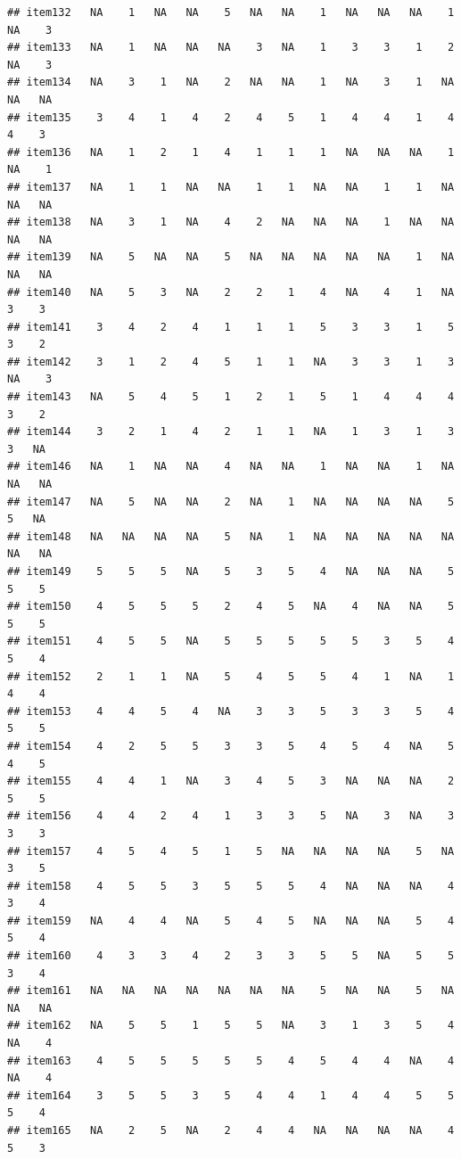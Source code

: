 \documentclass[
  man]{apa6}
\begin{document}
\begin{verbatim}
## item132   NA    1   NA   NA    5   NA   NA    1   NA   NA   NA    1   NA    3
## item133   NA    1   NA   NA   NA    3   NA    1    3    3    1    2   NA    3
## item134   NA    3    1   NA    2   NA   NA    1   NA    3    1   NA   NA   NA
## item135    3    4    1    4    2    4    5    1    4    4    1    4    4    3
## item136   NA    1    2    1    4    1    1    1   NA   NA   NA    1   NA    1
## item137   NA    1    1   NA   NA    1    1   NA   NA    1    1   NA   NA   NA
## item138   NA    3    1   NA    4    2   NA   NA   NA    1   NA   NA   NA   NA
## item139   NA    5   NA   NA    5   NA   NA   NA   NA   NA    1   NA   NA   NA
## item140   NA    5    3   NA    2    2    1    4   NA    4    1   NA    3    3
## item141    3    4    2    4    1    1    1    5    3    3    1    5    3    2
## item142    3    1    2    4    5    1    1   NA    3    3    1    3   NA    3
## item143   NA    5    4    5    1    2    1    5    1    4    4    4    3    2
## item144    3    2    1    4    2    1    1   NA    1    3    1    3    3   NA
## item146   NA    1   NA   NA    4   NA   NA    1   NA   NA    1   NA   NA   NA
## item147   NA    5   NA   NA    2   NA    1   NA   NA   NA   NA    5    5   NA
## item148   NA   NA   NA   NA    5   NA    1   NA   NA   NA   NA   NA   NA   NA
## item149    5    5    5   NA    5    3    5    4   NA   NA   NA    5    5    5
## item150    4    5    5    5    2    4    5   NA    4   NA   NA    5    5    5
## item151    4    5    5   NA    5    5    5    5    5    3    5    4    5    4
## item152    2    1    1   NA    5    4    5    5    4    1   NA    1    4    4
## item153    4    4    5    4   NA    3    3    5    3    3    5    4    5    5
## item154    4    2    5    5    3    3    5    4    5    4   NA    5    4    5
## item155    4    4    1   NA    3    4    5    3   NA   NA   NA    2    5    5
## item156    4    4    2    4    1    3    3    5   NA    3   NA    3    3    3
## item157    4    5    4    5    1    5   NA   NA   NA   NA    5   NA    3    5
## item158    4    5    5    3    5    5    5    4   NA   NA   NA    4    3    4
## item159   NA    4    4   NA    5    4    5   NA   NA   NA    5    4    5    4
## item160    4    3    3    4    2    3    3    5    5   NA    5    5    3    4
## item161   NA   NA   NA   NA   NA   NA   NA    5   NA   NA    5   NA   NA   NA
## item162   NA    5    5    1    5    5   NA    3    1    3    5    4   NA    4
## item163    4    5    5    5    5    5    4    5    4    4   NA    4   NA    4
## item164    3    5    5    3    5    4    4    1    4    4    5    5    5    4
## item165   NA    2    5   NA    2    4    4   NA   NA   NA   NA    4    5    3

\end{verbatim}
\end{document}
